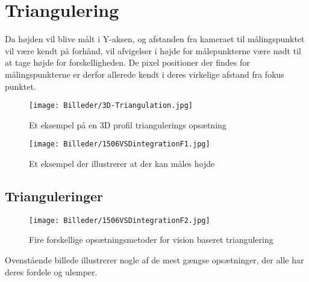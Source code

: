 \section{Triangulering\label{triangulering}}

Da højden vil blive målt i Y-aksen, og afstanden fra kameraet til målingspunktet vil være kendt på forhånd, vil afvigelser i højde for målepunkterne være nødt til at tage højde for forskelligheden.
De pixel positioner der findes for målingspunkterne er derfor allerede kendt i deres virkelige afstand fra fokus punktet.

\begin{figure}[!ht]
  \centering
    \texttt{[image: Billeder/3D-Triangulation.jpg]}
  \caption{Et eksempel på en 3D profil triangulerings opsætning\label{fig:triangulation1}}
\end{figure}

\begin{figure}[!ht]
  \centering
    \texttt{[image: Billeder/1506VSDintegrationF1.jpg]}
  \caption{Et eksempel der illustrerer at der kan måles højde\label{fig:triangulation2}}
\end{figure}

\subsection{Trianguleringer}

\begin{figure}[!ht]
  \centering
    \texttt{[image: Billeder/1506VSDintegrationF2.jpg]}
  \caption{Fire forskellige opsætningsmetoder for vision baseret triangulering\label{fig:triangulation3}}
\end{figure}

Ovenstående billede illustrerer nogle af de mest gængse opsætninger, der alle har deres fordele og ulemper.




